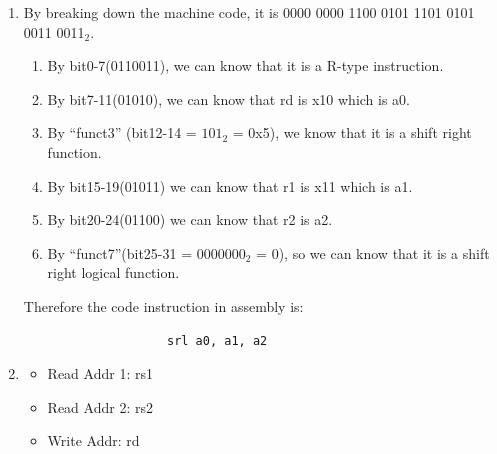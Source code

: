 \documentclass[12pt, a4paper]{article}
\begin{document}
\begin{ans}
    \begin{enumerate}
        \item By breaking down the machine code, it is 0000 0000 1100 0101 1101 0101 0011 0011$_2$. 
                \begin{enumerate}
                    \item By bit0-7(0110011), we can know that it is a R-type instruction. 
                    \item By bit7-11(01010), we can know that rd is x10 which is a0.
                    \item By ``funct3'' (bit12-14 = $101_2$ = 0x5), we know that it is a shift right function. 
                    \item By bit15-19(01011) we can know that r1 is x11 which is a1.
                    \item By bit20-24(01100) we can know that r2 is a2. 
                    \item By ``funct7''(bit25-31 = 0000000$_2$ = 0), so we can know that it is a shift right logical function. 
                \end{enumerate}
                Therefore the code instruction in assembly is:
                \begin{verbatim}
                    srl a0, a1, a2
                \end{verbatim}
        \item 
        \begin{itemize}
            \item Read Addr 1: rs1
            \item Read Addr 2: rs2
            \item Write Addr: rd
        \end{itemize}
    \end{enumerate}
\end{ans}
\pagebreak
\end{document}
